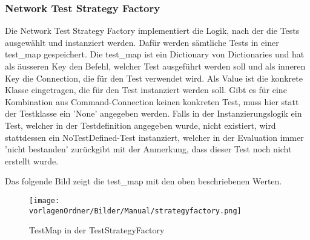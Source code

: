 \documentclass[]{subfiles}
\begin{document}
	\subsubsection{Network Test Strategy Factory}
		Die Network Test Strategy Factory implementiert die Logik, nach der die Tests ausgewählt 
		und instanziert werden.
		Dafür werden sämtliche Tests in einer test\_map gespeichert. 
		Die test\_map ist ein Dictionary von Dictionaries und hat als äusseren Key 
		den Befehl, welcher Test ausgeführt werden soll und als inneren Key die Connection,
		die für den Test verwendet wird. 
		Als Value ist die konkrete Klasse eingetragen, die für den Test instanziert werden soll.
		Gibt es für eine Kombination aus Command-Connection keinen konkreten Test, 
		muss hier statt der Testklasse ein 'None' angegeben werden. 
		Falls in der Instanzierungslogik ein Test, welcher in der Testdefinition angegeben wurde,
		nicht existiert, wird stattdessen ein NoTestDefined-Test instanziert, welcher 
		in der Evaluation immer 'nicht bestanden' zurückgibt mit der Anmerkung, dass dieser
		Test noch nicht erstellt wurde.

		Das folgende Bild zeigt die test\_map mit den oben beschriebenen Werten.

		\begin{figure}[h!]
			\begin{center}
		        \texttt{[image: \\vorlagenOrdner/Bilder/Manual/strategyfactory.png]}
				\caption{TestMap in der TestStrategyFactory}
			\end{center}
		\end{figure}
        
\end{document}
